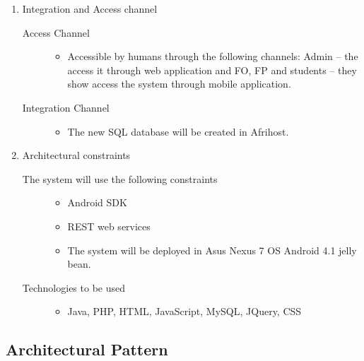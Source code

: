 \documentclass[10pt,a4paper]{article}
\begin{document}
\begin{enumerate}
\begin{description}
\end{description}

\item Integration and Access channel
\begin{description}
\item [Access Channel]

\begin{itemize}
\item Accessible by humans through the following channels:	Admin – the access it through web application and FO, FP and students – they show access the system through mobile application.
\end{itemize}

\item [Integration Channel]

\begin{itemize}
\item The new SQL database will be created in Afrihost.
\end{itemize}
\end{description}

\item Architectural constraints
\begin{description}
\item [The system will use the following constraints]

\begin{itemize}
\item Android SDK
\item REST web services
\item The system will be deployed in Asus Nexus 7 OS Android 4.1 jelly bean.
\end{itemize}

\item [Technologies to be used]

\begin{itemize}
\item Java, PHP, HTML, JavaScript, MySQL,  JQuery, CSS
\end{itemize}
\end{description}

\end{enumerate}
\subsection{Architectural Pattern}
\end{document}
